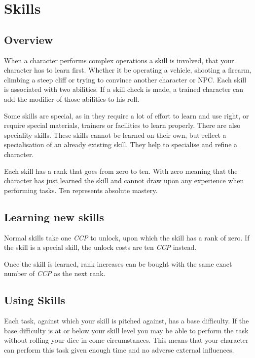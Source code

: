 \newcommand{\skill}[1]{\belowpdfbookmark{#1}{#1}\item[#1]}

\chapter{Skills}
\label{chap:Skills}

\section{Overview}
\label{sec:4-Overview}

When a character performs complex operations a skill is involved, that your
character has to learn first. Whether it be operating a vehicle, shooting a
firearm, climbing a steep cliff or trying to convince another character or
NPC. Each skill is associated with two abilities. If a skill check is made,
a trained character can add the modifier of those abilities to his roll.

Some skills are special, as in they require a lot of effort to learn and use
right, or require special materials, trainers or facilities to learn properly.
There are also speciality skills. These skills cannot be learned on their own,
but reflect a specialisation of an already existing skill. They help to
specialise and refine a character.

Each skill has a rank that goes from zero to ten. With zero meaning that the
character has just learned the skill and cannot draw upon any experience when
performing tasks. Ten represents absolute mastery.

\section{Learning new skills}
\label{sec:4-Learning new skills}

Normal skills take one \emph{CCP} to unlock, upon which the skill has a rank
of zero. If the skill is a special skill, the unlock costs are ten \emph{CCP}
instead.

Once the skill is learned, rank increases can be bought with the same exact
number of \emph{CCP} as the next rank.

\section{Using Skills}
\label{sec:4-Using Skills}

Each task, against which your skill is pitched against, has a base difficulty.
If the base difficulty is at or below your skill level you may be able to
perform the task without rolling your dice in come circumstances. This means
that your character can perform this task given enough time and no adverse
external influences.

